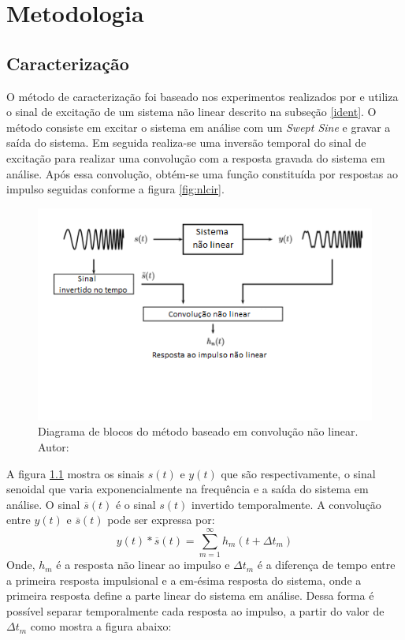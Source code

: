 \chapter{Metodologia} \label{cap3}

\section{Caracterização}

O método de caracterização foi baseado nos experimentos realizados por \cite{farina2001non} e utiliza o sinal de excitação de um sistema não linear descrito na subseção \ref{ident}. O método consiste em excitar o sistema em análise com um \textit{Swept Sine} e gravar a saída do sistema. Em seguida	realiza-se uma inversão temporal do sinal de excitação para realizar uma convolução com a resposta gravada do sistema em análise. Após essa convolução, obtém-se uma função constituída por respostas ao impulso seguidas conforme a figura \ref{fig:nlcir}.

\begin{figure}[!htb]
	\centering
	\includegraphics[width=0.9\linewidth]{figuras/NLCM}
	\caption{Diagrama de blocos do método baseado em convolução não linear. Autor: \cite{novakdissertation}}
	\label{fig:nlcm}
\end{figure}

A figura \ref{fig:nlcm} mostra os sinais $s(t)$ e $y(t)$ que são respectivamente, o sinal senoidal que varia exponencialmente na frequência e a saída do sistema em análise. O sinal $\overline{s}(t)$ é o sinal $s(t)$ invertido temporalmente. A convolução entre $y(t)$ e $\overline{s}(t)$ pode ser expressa por:
\begin{equation}
y(t) \ast \overline{s}(t) = \sum_{m=1}^{\infty}h_{m}(t + \Delta t_{m})
\label{kernel}
\end{equation}
Onde, $h_{m}$ é a resposta não linear ao impulso e $\Delta t_{m}$ é a diferença de tempo entre a primeira resposta impulsional e a em-ésima resposta do sistema, onde a primeira resposta define a parte linear do sistema em análise. Dessa forma é possível separar temporalmente cada resposta ao impulso, a partir do valor de $\Delta t_{m}$ como mostra a figura abaixo:

